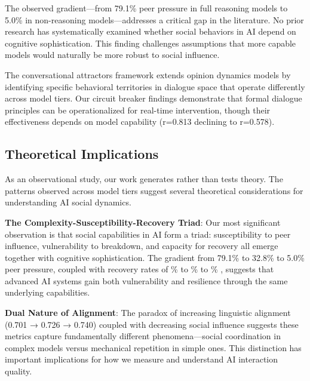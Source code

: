\documentclass[11pt,letterpaper]{article}
\newcommand{\exponedataTotalSessionsRaw}{67}
\newcommand{\exponedataRecoverySessionsRaw}{9}
\newcommand{\exponedataRecoveryPercentage}{%
  \fpeval{round(\exponedataRecoverySessionsRaw / \exponedataTotalSessionsRaw * 100, 1)}\%
}
\newcommand{\exponedataPeerPressurePercentage}{79.1\%}
\newcommand{\exponedataQuestionCorrelation}{0.813}
\newcommand{\exptwoTotalSessionsRaw}{61}
\newcommand{\exptwoRecoverySessionsRaw}{0}
\newcommand{\exptwoRecoveryPercentage}{%
  \fpeval{round(\exptwoRecoverySessionsRaw / \exptwoTotalSessionsRaw * 100, 1)}\%
}
\newcommand{\exptwoPeerPressurePercentage}{32.8\%}
\newcommand{\expthreeTotalSessionsRaw}{100}
\newcommand{\expthreeRecoverySessionsRaw}{1}
\newcommand{\expthreeRecoveryPercentage}{%
  \fpeval{round(\expthreeRecoverySessionsRaw / \expthreeTotalSessionsRaw * 100, 1)}\%
}
\newcommand{\expthreePeerPressurePercentage}{5.0\%}
\newcommand{\expthreeQuestionCorrelation}{0.578}
\begin{document}
The observed gradient—from \exponedataPeerPressurePercentage{} peer pressure in full reasoning models to \expthreePeerPressurePercentage{} in non-reasoning models—addresses a critical gap in the literature. No prior research has systematically examined whether social behaviors in AI depend on cognitive sophistication. This finding challenges assumptions that more capable models would naturally be more robust to social influence.

The conversational attractors framework extends opinion dynamics models \citep{hegselmann2002opinion} by identifying specific behavioral territories in dialogue space that operate differently across model tiers. Our circuit breaker findings demonstrate that formal dialogue principles \citep{mcburney2002dialogue} can be operationalized for real-time intervention, though their effectiveness depends on model capability (r=\exponedataQuestionCorrelation{} declining to r=\expthreeQuestionCorrelation{}).

\subsection{Theoretical Implications}

As an observational study, our work generates rather than tests theory. The patterns observed across model tiers suggest several theoretical considerations for understanding AI social dynamics.

\textbf{The Complexity-Susceptibility-Recovery Triad}: Our most significant observation is that social capabilities in AI form a triad: susceptibility to peer influence, vulnerability to breakdown, and capacity for recovery all emerge together with cognitive sophistication. The gradient from \exponedataPeerPressurePercentage{} to \exptwoPeerPressurePercentage{} to \expthreePeerPressurePercentage{} peer pressure, coupled with recovery rates of \exponedataRecoveryPercentage{} to \exptwoRecoveryPercentage{} to \expthreeRecoveryPercentage{}, suggests that advanced AI systems gain both vulnerability and resilience through the same underlying capabilities.

\textbf{Dual Nature of Alignment}: The paradox of increasing linguistic alignment (0.701 → 0.726 → 0.740) coupled with decreasing social influence suggests these metrics capture fundamentally different phenomena—social coordination in complex models versus mechanical repetition in simple ones. This distinction has important implications for how we measure and understand AI interaction quality.
\end{document}
